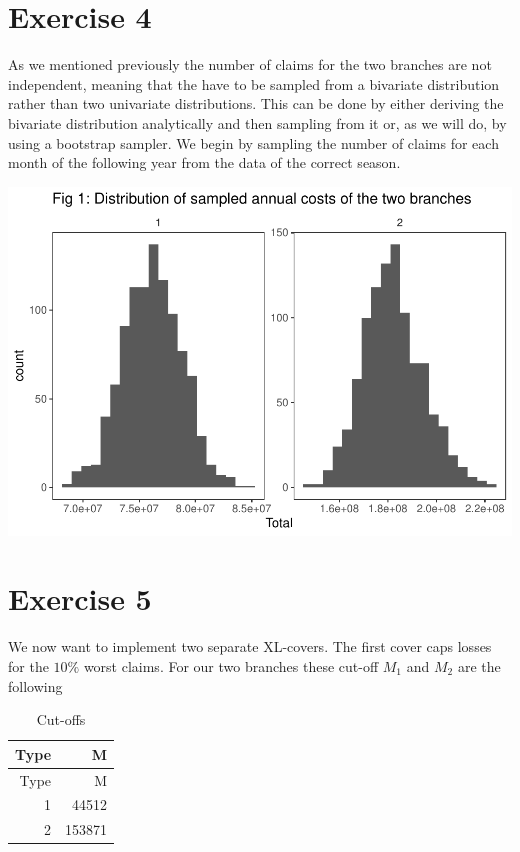 \documentclass[]{article}
\begin{document}
\section{Exercise 4}\label{exercise-4}

As we mentioned previously the number of claims for the two branches are
not independent, meaning that the have to be sampled from a bivariate
distribution rather than two univariate distributions. This can be done
by either deriving the bivariate distribution analytically and then
sampling from it or, as we will do, by using a bootstrap sampler. We
begin by sampling the number of claims for each month of the following
year from the data of the correct season.

\includegraphics{Projekt1_files/figure-latex/unnamed-chunk-10-1.pdf}

\section{Exercise 5}\label{exercise-5}

We now want to implement two separate XL-covers. The first cover caps
losses for the \(10\%\) worst claims. For our two branches these cut-off
\(M_1\) and \(M_2\) are the following

\begin{longtable}[]{@{}rr@{}}
\caption{Cut-offs}\tabularnewline
\toprule
Type & M\tabularnewline
\midrule
\endfirsthead
\toprule
Type & M\tabularnewline
\midrule
\endhead
1 & 44512\tabularnewline
2 & 153871\tabularnewline
\bottomrule
\end{longtable}
\end{document}
